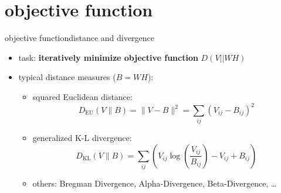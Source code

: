     \section[objective function]{objective function}
        \begin{frame}{objective function}{distance and divergence}
            \begin{itemize}
                \item   task: \textbf{iteratively minimize objective function} $D(V || WH)$
                \bigskip
                \item   typical distance measures ($B = WH$):
                   \begin{itemize}
                        \item  squared Euclidean distance:\\
                        \begin{equation*}
                        D_\mathrm{EU}( V \parallel B) = \parallel V - B\parallel^{2} = \sum_{i j} (V_{i j} - B_{i j})^{2}
                        \end{equation*}
                       \item  generalized K-L divergence:\\
                       \begin{equation*}
                        D_\mathrm{KL}( V \parallel B) = \sum_{i j} (V_{i j} \log\left(\frac{V_{i j}}{B_{i j}}\right) - V_{i j} + B_{i j})
                        \end{equation*}		                
                        \smallskip
                        \item<2-> others: Bregman Divergence, Alpha-Divergence, Beta-Divergence, \ldots 
                   \end{itemize}
            \end{itemize}
        
        \end{frame}          
    

